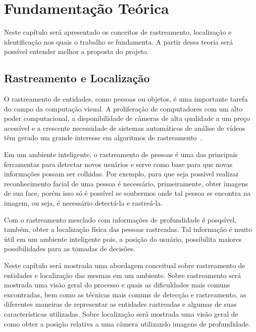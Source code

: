 \chapter{Fundamentação Teórica}

	Neste capítulo será apresentado os conceitos de rastreamento, localização e identificação nos quais o trabalho se fundamenta. A partir dessa teoria será possível entender melhor a proposta do projeto.

\section{Rastreamento e Localização}

	O rastreamento de entidades, como pessoas ou objetos, é uma importante tarefa
	do campo da computação visual. A proliferação de computadores com um alto poder
	computacional, a disponibilidade de câmeras de alta qualidade a um preço
	acessível e a crescente necessidade de sistemas automáticos de análise de
	vídeos têm gerado um grande interesse em algoritmos de rastreamento~\cite{yilmaz}.

	Em um ambiente inteligente, o rastreamento de pessoas é uma das principais
	ferramentas para detectar novos usuários e serve como base para que novas
	informações possam ser colhidas. Por exemplo, para que seja possível realizar
	reconhecimento facial de uma pessoa é necessário, primeiramente, obter imagens
	de sua face, porém isso só é possível se soubermos onde tal pessoa se encontra
	na imagem, ou seja, é necessário detectá-la e rastreá-la.

	Com o rastreamento mesclado com informações de profundidade é posqsível,
	também, obter a localização física das pessoas rastreadas. Tal informação é
	muito útil em um ambiente inteligente pois, a posição do usuário,
	possibilita maiores possibilidades para as tomadas de decisões.

	Neste capítulo será mostrada uma abordagem conceitual sobre rastreamento de
	entidades e localização das mesmas em um ambiente. Sobre rastreamento será
	mostrada uma visão geral do processo e quais as dificuldades mais comuns
	encontradas, bem como as técnicas mais comuns de detecção e rastreamento, as
	diferentes maneiras de representar as entidades rastreadas e algumas de suas
	características utilizadas. Sobre localização será mostrada uma visão geral de
	como obter a posição relativa a uma câmera utilizando imagens de profundidade.

	
	

